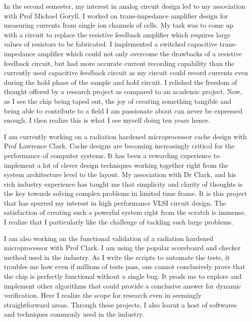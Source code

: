 \documentclass[11pt, letterpaper]{article}
\begin{document}
In the second semester, my interest in analog circuit design led to my association with Prof Michael Goryll. I worked on trans-impedance amplifier design for measuring currents from single ion channels of cells. My task was to come up with a circuit to replace the resistive feedback amplifier which requires large values of resistors to be fabricated. I implemented a switched capacitive trans-impedance amplifier which could not only overcome the drawbacks of a resistive feedback circuit, but had more accurate current recording capability than the currently used capacitive feedback circuit as my circuit could record currents even during the hold phase of the sample and hold circuit. I relished the freedom of thought offered by a research project as compared to an academic project. Now, as I see the chip being taped out, the joy of creating something tangible and being able to contribute to a field I am passionate about can never be expressed enough. I then realize this is what I see myself doing ten years hence. 

I am currently working on a radiation hardened microprocessor cache design with Prof Lawrence Clark.  Cache designs are becoming increasingly critical for the performance of computer systems.  It has been a rewarding experience to implement a lot of clever design techniques working together right from the system architecture level to the layout. My association with Dr Clark, and his rich industry experience has taught me that simplicity and clarity of thoughts is the key towards solving complex problems in limited time frame. It is this project that has spurred my interest in high performance VLSI circuit design. The satisfaction of creating such a powerful system right from the scratch is immense.  I realize that I particularly like the challenge of tackling such large problems. 

I am also working on the functional validation of a radiation hardened microprocessor with Prof Clark. I am using the popular scoreboard and checker method used in the industry.  As I write the scripts to automate the tests,  it troubles me how even if millions of tests pass, one cannot conclusively prove that the chip is perfectly functional without a single bug. It prods me to explore and implement other algorithms that could provide a conclusive answer for dynamic verification.  Here I realize the scope for research even in seemingly straightforward areas.  Through these projects, I also learnt a host of softwares and techniques commonly used in the industry.
\end{document}
